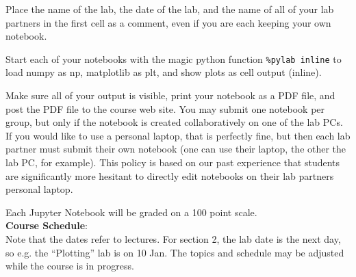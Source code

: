 \documentclass[12pt]{article}
\begin{document}
Place the name of the lab, the date of the lab, and the name of all of
your lab partners in the first cell as a comment, even if you are each
keeping your own notebook.

Start each of your notebooks with the magic python function
{\tt\%pylab inline} to load numpy as np, matplotlib as plt, and show
plots as cell output (inline).

Make sure all of your output is visible, print your notebook
as a PDF file, and post the PDF file to the course web site.  You may submit one notebook
per group, but only if the notebook is created collaboratively on one
of the lab PCs.  If you would like to use a personal laptop, that is
perfectly fine, but then each lab partner must submit their own
notebook (one can use their laptop, the other the lab PC, for
example).  This policy is based on our past experience that students
are significantly more hesitant to directly edit notebooks on their
lab partners personal laptop.

Each Jupyter Notebook will be graded on a 100 point scale.\\

\noindent
\textbf {Course Schedule}:\\
Note that the dates refer to lectures.  For section 2, the lab date is the next day, so e.g. the ``Plotting'' lab is on 10 Jan.  The topics and schedule may be adjusted while the course is in progress.
\end{document}
